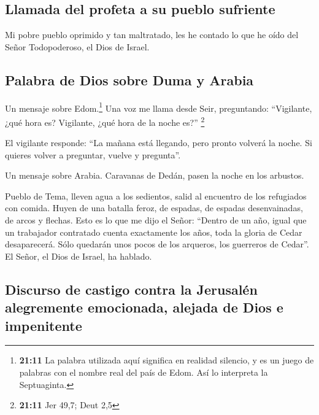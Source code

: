 \hypertarget{llamada-del-profeta-a-su-pueblo-sufriente}{%
\subsection{Llamada del profeta a su pueblo
sufriente}\label{llamada-del-profeta-a-su-pueblo-sufriente}}

 Mi pobre pueblo oprimido y tan maltratado, les he
contado lo que he oído del Señor Todopoderoso, el Dios de Israel.

\hypertarget{palabra-de-dios-sobre-duma-y-arabia}{%
\subsection{Palabra de Dios sobre Duma y
Arabia}\label{palabra-de-dios-sobre-duma-y-arabia}}

 Un mensaje sobre Edom.\footnote{\textbf{21:11} La
  palabra utilizada aquí significa en realidad silencio, y es un juego
  de palabras con el nombre real del país de Edom. Así lo interpreta la
  Septuaginta.} Una voz me llama desde Seir, preguntando: ``Vigilante,
¿qué hora es? Vigilante, ¿qué hora de la noche es?'' \footnote{\textbf{21:11}
  Jer 49,7; Deut 2,5}

 El vigilante responde: ``La mañana está llegando, pero
pronto volverá la noche. Si quieres volver a preguntar, vuelve y
pregunta''.

 Un mensaje sobre Arabia. Caravanas de Dedán, pasen la
noche en los arbustos.

 Pueblo de Tema, lleven agua a los sedientos, salid al
encuentro de los refugiados con comida.  Huyen de una
batalla feroz, de espadas, de espadas desenvainadas, de arcos y flechas.
 Esto es lo que me dijo el Señor: ``Dentro de un año,
igual que un trabajador contratado cuenta exactamente los años, toda la
gloria de Cedar desaparecerá.  Sólo quedarán unos pocos
de los arqueros, los guerreros de Cedar''. El Señor, el Dios de Israel,
ha hablado.

\hypertarget{discurso-de-castigo-contra-la-jerusaluxe9n-alegremente-emocionada-alejada-de-dios-e-impenitente}{%
\subsection{Discurso de castigo contra la Jerusalén alegremente
emocionada, alejada de Dios e
impenitente}\label{discurso-de-castigo-contra-la-jerusaluxe9n-alegremente-emocionada-alejada-de-dios-e-impenitente}}

